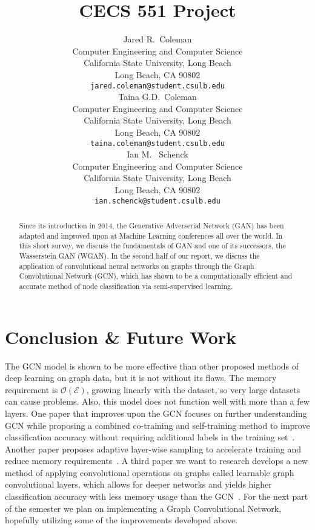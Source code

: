 \documentclass{article}
\title{CECS 551 Project}
\author{%
  Jared R.~Coleman\\
  Computer Engineering and Computer Science\\
  California State University, Long Beach\\
  Long Beach, CA 90802 \\
  \texttt{jared.coleman@student.csulb.edu} \\
  \And 
  Taina G.D.~Coleman\\
  Computer Engineering and Computer Science\\
  California State University, Long Beach\\
  Long Beach, CA 90802 \\
  \texttt{taina.coleman@student.csulb.edu} \\
  \And 
  Ian M. ~Schenck\\
  Computer Engineering and Computer Science\\
  California State University, Long Beach\\
  Long Beach, CA 90802 \\
  \texttt{ian.schenck@student.csulb.edu} \\
}
\begin{document}
\setcounter{equation}{0}

\maketitle

\begin{abstract}
   Since its introduction in 2014, the Generative Adverserial Network (GAN) has been adapted and improved upon at Machine Learning conferences all over the world. In this short survey, we discuss the fundamentals of GAN and one of its successors, the Wasserstein GAN (WGAN). In the second half of our report, we discuss the application of convolutional neural networks on graphs through the Graph Convolutional Network (GCN), which has shown to be a computationally efficient and accurate method of node classification via semi-supervised learning.
\end{abstract}





\section{Conclusion \& Future Work}
The GCN model is shown to be more effective than other proposed methods of deep learning on graph data, but it is not without its flaws. The memory requirement is $\mathcal{O}(\mathcal{E})$, growing linearly with the dataset, so very large datasets can cause problems. Also, this model does not function well with more than a few layers. One paper that improves upon the GCN focuses on further understanding GCN while proposing a combined co-training and self-training method to improve classification accuracy without requiring additional labels in the training set~\cite{Li2018}. Another paper proposes adaptive layer-wise sampling to accelerate training and reduce memory requirements~\cite{Huang2018}. A third paper we want to research develops a new method of applying convolutional operations on graphs called learnable graph convolutional layers, which allows for deeper networks and yields higher classification accuracy with less memory usage than the GCN~\cite{Gao2018}. For the next part of the semester we plan on implementing a Graph Convolutional Network, hopefully utilizing some of the improvements developed above.
  


\end{document}
